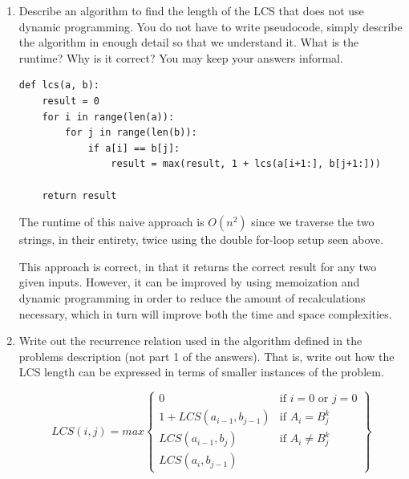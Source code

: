 \documentclass[12pt,letterpaper]{article}
\begin{document}
\begin{enumerate}
    \item Describe an algorithm to find the length of the LCS that does not use dynamic programming. 
    You do not have to write pseudocode, simply describe the algorithm in enough detail so that we understand it. 
    What is the runtime?
    Why is it correct?
    You may keep your answers informal. 
    
     \begin{lstlisting}[style = Python]
def lcs(a, b):
    result = 0
    for i in range(len(a)):
        for j in range(len(b)):
            if a[i] == b[j]:
                result = max(result, 1 + lcs(a[i+1:], b[j+1:]))
                
    return result
    \end{lstlisting}

    The runtime of this naive approach is $O(n^2)$ since we traverse the two strings, in their entirety, twice using the double for-loop setup seen above.

    This approach is correct, in that it returns the correct result for any two given inputs. However, it can be improved by using memoization and dynamic programming in order to reduce the amount of recalculations necessary, which in turn will improve both the time and space complexities.

    \vspace{0.25in}
    
    \item Write out the recurrence relation used in the algorithm defined in the problems description (not part 1 of the answers). 
    That is, write out how the LCS length can be expressed in terms of smaller instances of the problem.
    
    \begin{equation}
        LCS(i,j) = max
        \left\{
            \begin{array}{lr}
                0 & \text{if } i=0 \text{ or } j=0\\
                1+LCS(a_{i-1}, b_{j-1}) & \text{if } A_i = B_j^k\\
                LCS(a_{i-1}, b_j) & \text{if } A_i \neq B_j^k\\
                LCS(a_i, b_{j-1})
            \end{array}
        \right\}
    \end{equation}


\end{enumerate}
\end{document}
